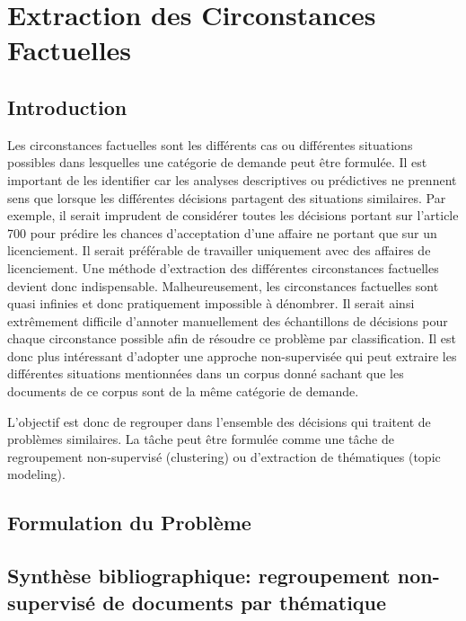  \chapter{Extraction des Circonstances Factuelles}
\label{chap:similarite}

% 

\section{Introduction}
\label{sec:similarite:introduction}
Les circonstances factuelles sont les différents cas ou différentes situations possibles dans lesquelles une catégorie de demande peut être formulée. Il est important de les identifier car les analyses descriptives ou prédictives ne prennent sens que lorsque les différentes décisions partagent des situations similaires. Par exemple, il serait imprudent de considérer toutes les décisions portant sur l'article 700 pour prédire les chances d'acceptation d'une affaire ne portant que sur un licenciement. Il serait préférable de travailler uniquement avec des affaires de licenciement. Une méthode d'extraction des différentes circonstances factuelles devient donc indispensable. Malheureusement, les circonstances factuelles sont quasi infinies et donc pratiquement impossible à dénombrer. Il serait ainsi extrêmement difficile d'annoter manuellement des échantillons de décisions pour chaque circonstance possible afin de résoudre ce problème par classification. Il est donc plus intéressant d'adopter une approche non-supervisée qui peut extraire les différentes situations mentionnées dans un corpus donné sachant que les documents de ce corpus sont de la même catégorie de demande.

L’objectif est donc de regrouper dans l’ensemble des décisions qui traitent de problèmes similaires. La tâche peut être formulée comme une tâche de regroupement non-supervisé (clustering) ou d’extraction de thématiques (topic modeling). 
\section{Formulation du Problème}
\label{sec:similarite:probleme}


\section{Synthèse bibliographique: regroupement non-supervisé de documents par thématique}
\label{sec:similarite:biblio}

